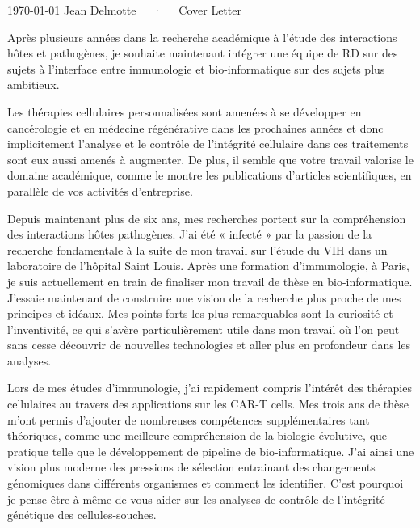 \documentclass[11pt, a4paper]{awesome-cv}
\begin{document}
\makecvheader[R]

\makecvfooter
  {\today}
  {Jean Delmotte~~~·~~~Cover Letter}
  {\thepage}
\makelettertitle

\begin{cvletter}

Après plusieurs années dans la recherche académique à l’étude des interactions hôtes et pathogènes, je souhaite maintenant intégrer une équipe de RD sur des sujets à l’interface entre immunologie et bio-informatique sur des sujets plus ambitieux.


Les thérapies cellulaires personnalisées sont amenées à se développer en cancérologie et en médecine régénérative dans les prochaines années et donc implicitement l'analyse et le contrôle de l'intégrité cellulaire dans ces traitements sont eux aussi amenés à augmenter. De plus, il semble que votre travail valorise le domaine académique, comme le montre les publications d'articles scientifiques, en parallèle de vos activités d'entreprise.

Depuis maintenant plus de six ans, mes recherches portent sur la compréhension des interactions hôtes pathogènes. J'ai été « infecté » par la passion de la recherche fondamentale à la suite de mon travail sur l'étude du VIH dans un laboratoire de l'hôpital Saint Louis. Après une formation d'immunologie, à Paris, je suis actuellement en train de finaliser mon travail de thèse en bio-informatique. J'essaie maintenant de construire une vision de la recherche plus proche de mes principes et idéaux. Mes points forts les plus remarquables sont la curiosité et l'inventivité, ce qui s'avère particulièrement utile dans mon travail où l'on peut sans cesse découvrir de nouvelles technologies et aller plus en profondeur dans les analyses.

Lors de mes études d'immunologie, j'ai rapidement compris l'intérêt des thérapies cellulaires au travers des applications sur les CAR-T cells. Mes trois ans de thèse m'ont permis d'ajouter de nombreuses compétences supplémentaires tant théoriques, comme une meilleure compréhension de la biologie évolutive, que pratique telle que le développement de pipeline de bio-informatique. J'ai ainsi une vision plus moderne des pressions de sélection entrainant des changements génomiques dans différents organismes et comment les identifier. C'est pourquoi je pense être à même de vous aider sur les analyses de contrôle de l'intégrité génétique des cellules-souches.


\end{cvletter}


\makeletterclosing
\end{document}

